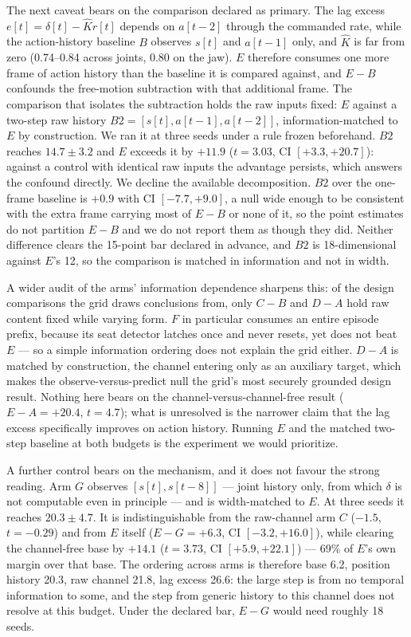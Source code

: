 \documentclass{article}
\begin{document}
The next caveat bears on the comparison declared as primary. The lag excess
$e[t] = \delta[t] - \hat{K} r[t]$ depends on $a[t{-}2]$ through the commanded
rate, while the action-history baseline $B$ observes $s[t]$ and $a[t{-}1]$
only, and $\hat{K}$ is far from zero (0.74--0.84 across joints, 0.80 on the
jaw). $E$ therefore consumes one more frame of action history than the
baseline it is compared against, and $E{-}B$ confounds the free-motion
subtraction with that additional frame. The comparison that isolates the
subtraction holds the raw inputs fixed: $E$ against a two-step raw history
$B2 = [s[t], a[t{-}1], a[t{-}2]]$, information-matched to $E$ by construction.
We ran it at three seeds under a rule frozen beforehand. $B2$ reaches
$14.7 \pm 3.2$ and $E$ exceeds it by $+11.9$ ($t = 3.03$, CI
$[+3.3, +20.7]$): against a control with identical raw inputs the advantage
persists, which answers the confound directly. We decline the available
decomposition. $B2$ over the one-frame baseline is $+0.9$ with CI
$[-7.7, +9.0]$, a null wide enough to be consistent with the extra frame
carrying most of $E{-}B$ or none of it, so the point estimates do not
partition $E{-}B$ and we do not report them as though they did. Neither
difference clears the 15-point bar declared in advance, and $B2$ is
18-dimensional against $E$'s 12, so the comparison is matched in information
and not in width.

A wider
audit of the arms' information dependence sharpens this: of the design
comparisons the grid draws conclusions from, only $C{-}B$ and $D{-}A$ hold raw
content fixed while varying form. $F$ in particular consumes an entire episode
prefix, because its seat detector latches once and never resets, yet does not
beat $E$ --- so a simple information ordering does not explain the grid either.
$D{-}A$ is matched by construction, the channel entering only as an auxiliary
target, which makes the observe-versus-predict null the grid's most securely
grounded design result. Nothing here bears on the channel-versus-channel-free
result ($E{-}A = +20.4$, $t = 4.7$); what is unresolved is the narrower claim
that the lag excess specifically improves on action history. Running $E$ and
the matched two-step baseline at both budgets is the experiment we would
prioritize.

A further control bears on the mechanism, and it does not favour the
strong reading. Arm $G$ observes $[s[t], s[t{-}8]]$ --- joint history only, from
which $\delta$ is not computable even in principle --- and is width-matched
to $E$. At three seeds it reaches $20.3 \pm 4.7$. It is indistinguishable
from the raw-channel arm $C$ ($-1.5$, $t = -0.29$) and from $E$ itself
($E{-}G = +6.3$, CI $[-3.2, +16.0]$), while clearing the channel-free base
by $+14.1$ ($t = 3.73$, CI $[+5.9, +22.1]$) --- 69\% of $E$'s own margin
over that base. The ordering across arms is therefore base 6.2, position
history 20.3, raw channel 21.8, lag excess 26.6: the large step is from no
temporal information to some, and the step from generic history to this
channel does not resolve at this budget. Under the declared bar,
$E{-}G$ would need roughly 18 seeds.
\end{document}
